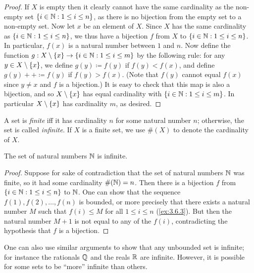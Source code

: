 \begin{proof}
  If \(X\) is empty then it clearly cannot have the same cardinality as the non-empty set \(\left\lbrace i \in \mathbb{N} : 1 \leq i \leq n\right\rbrace\), as there is no bijection from the empty set to a non-empty set.
  Now let \(x\) be an element of \(X\).
  Since \(X\) has the same cardinality as \(\left\lbrace i \in \mathbb{N} : 1 \leq i \leq n\right\rbrace\), we thus have a bijection \(f\) from \(X\) to \(\left\lbrace i \in \mathbb{N} : 1 \leq i \leq n\right\rbrace\).
  In particular, \(f(x)\) is a natural number between \(1\) and \(n\).
  Now define the function \(g : X \setminus \left\lbrace x\right\rbrace \to \left\lbrace i \in \mathbb{N} : 1 \leq i \leq m\right\rbrace\) by the following rule: for any \(y \in X \setminus \left\lbrace x\right\rbrace\), we define \(g(y) \coloneqq f(y)\) if \(f(y) < f(x)\), and define \(g(y)++ \coloneqq f(y)\) if \(f(y) > f(x)\).
  (Note that \(f(y)\) cannot equal \(f(x)\) since \(y \neq x\) and \(f\) is a bijection.)
  It is easy to check that this map is also a bijection, and so \(X \setminus \left\lbrace x\right\rbrace\) has equal cardinality with \(\left\lbrace i \in \mathbb{N} : 1 \leq i \leq m\right\rbrace\).
  In particular \(X \setminus \left\lbrace x\right\rbrace\) has cardinality \(m\), as desired.
\end{proof}

\begin{defn}\label{3.6.10}
  A set is \emph{finite} iff it has cardinality \(n\) for some natural number \(n\);
  otherwise, the set is called \emph{infinite}.
  If \(X\) is a finite set, we use \(\#(X)\) to denote the cardinality of \(X\).
\end{defn}

\setcounter{thm}{11}
\begin{thm}\label{3.6.12}
  The set of natural numbers \(\mathbb{N}\) is infinite.
\end{thm}

\begin{proof}
  Suppose for sake of contradiction that the set of natural numbers \(\mathbb{N}\) was finite, so it had some cardinality \(\#(\mathbb{N}) = n\).
  Then there is a bijection \(f\) from \(\left\lbrace i \in \mathbb{N} : 1 \leq i \leq n\right\rbrace\) to \(\mathbb{N}\).
  One can show that the sequence \(f(1), f(2), \dots, f(n)\) is bounded, or more precisely that there exists a natural number \(M\) such that \(f(i) \leq M\) for all \(1 \leq i \leq n\) (\cref{ex:3.6.3}).
  But then the natural number \(M+1\) is not equal to any of the \(f(i)\), contradicting the hypothesis that \(f\) is a bijection.
\end{proof}

\begin{rmk}\label{3.6.13}
  One can also use similar arguments to show that any unbounded set is infinite;
  for instance the rationals \(\mathbb{Q}\) and the reals \(\mathbb{R}\) are infinite.
  However, it is possible for some sets to be ``more'' infinite than others.
\end{rmk}

